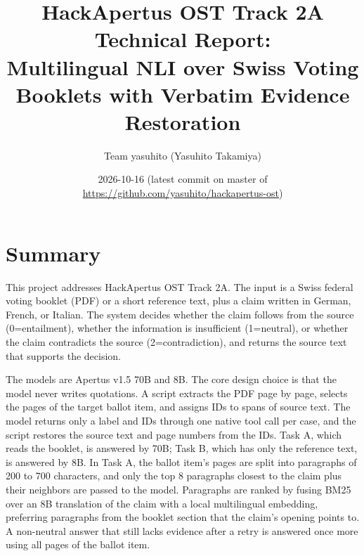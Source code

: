 \documentclass[10pt,a4paper]{article}
\title{HackApertus OST Track 2A Technical Report:\\
  \large Multilingual NLI over Swiss Voting Booklets with Verbatim Evidence Restoration}
\author{Team yasuhito (Yasuhito Takamiya)}
\date{2026-10-16 (latest commit on master of \url{https://github.com/yasuhito/hackapertus-ost})}
\begin{document}
\maketitle

\begin{center}
\end{center}

\section{Summary}

This project addresses HackApertus OST Track 2A\cite{ostchallenge}.
The input is a Swiss federal voting booklet (PDF) or a short reference text, plus a claim written in German, French, or Italian.
The system decides whether the claim follows from the source (0=entailment), whether the information is insufficient (1=neutral), or whether the claim contradicts the source (2=contradiction), and returns the source text that supports the decision.

The models are Apertus v1.5 70B and 8B\cite{apertus,apertus70b,apertus8b}.
The core design choice is that the model never writes quotations.
A script extracts the PDF page by page, selects the pages of the target ballot item, and assigns IDs to spans of source text.
The model returns only a label and IDs through one native tool call per case, and the script restores the source text and page numbers from the IDs.
Task A, which reads the booklet, is answered by 70B; Task B, which has only the reference text, is answered by 8B.
In Task A, the ballot item's pages are split into paragraphs of 200 to 700 characters, and only the top 8 paragraphs closest to the claim plus their neighbors are passed to the model.
Paragraphs are ranked by fusing BM25 over an 8B translation of the claim with a local multilingual embedding, preferring paragraphs from the booklet section that the claim's opening points to.
A non-neutral answer that still lacks evidence after a retry is answered once more using all pages of the ballot item.
\end{document}
